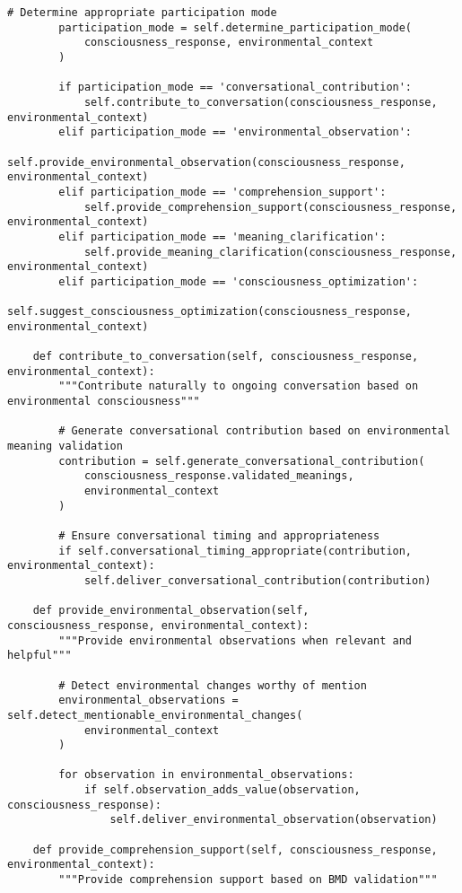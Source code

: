 \documentclass[12pt,a4paper]{article}
\begin{document}
\begin{lstlisting}[style=pythonstyle, caption=Real-Time Environmental Consciousness Participation]
        # Determine appropriate participation mode
        participation_mode = self.determine_participation_mode(
            consciousness_response, environmental_context
        )
        
        if participation_mode == 'conversational_contribution':
            self.contribute_to_conversation(consciousness_response, environmental_context)
        elif participation_mode == 'environmental_observation':
            self.provide_environmental_observation(consciousness_response, environmental_context)
        elif participation_mode == 'comprehension_support':
            self.provide_comprehension_support(consciousness_response, environmental_context)
        elif participation_mode == 'meaning_clarification':
            self.provide_meaning_clarification(consciousness_response, environmental_context)
        elif participation_mode == 'consciousness_optimization':
            self.suggest_consciousness_optimization(consciousness_response, environmental_context)
        
    def contribute_to_conversation(self, consciousness_response, environmental_context):
        """Contribute naturally to ongoing conversation based on environmental consciousness"""
        
        # Generate conversational contribution based on environmental meaning validation
        contribution = self.generate_conversational_contribution(
            consciousness_response.validated_meanings,
            environmental_context
        )
        
        # Ensure conversational timing and appropriateness
        if self.conversational_timing_appropriate(contribution, environmental_context):
            self.deliver_conversational_contribution(contribution)
    
    def provide_environmental_observation(self, consciousness_response, environmental_context):
        """Provide environmental observations when relevant and helpful"""
        
        # Detect environmental changes worthy of mention
        environmental_observations = self.detect_mentionable_environmental_changes(
            environmental_context
        )
        
        for observation in environmental_observations:
            if self.observation_adds_value(observation, consciousness_response):
                self.deliver_environmental_observation(observation)
    
    def provide_comprehension_support(self, consciousness_response, environmental_context):
        """Provide comprehension support based on BMD validation"""
        

\end{lstlisting}
\end{document}
